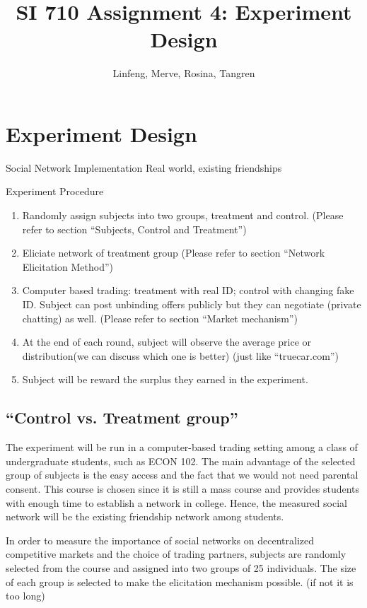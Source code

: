 \documentclass{article}
\title{SI 710 Assignment 4: Experiment Design}
\author{Linfeng, Merve, Rosina, Tangren}
\date{}
\begin{document}
\maketitle
%

\section{Experiment Design}
Social Network Implementation
Real world, existing friendships

Experiment Procedure
\begin{enumerate}
    \item Randomly assign subjects into two groups, treatment and control.
        (Please refer to section ``Subjects, Control and Treatment'')
    \item Eliciate network of treatment group (Please refer to section ``Network
        Elicitation Method'')
    \item Computer based trading: treatment with real ID; control with changing
        fake ID. Subject can post unbinding offers publicly but they can
        negotiate (private chatting) as well. (Please refer to section ``Market
        mechanism'')
    \item At the end of each round, subject will observe the average price or
        distribution(we can discuss which one is better) (just like
        ``truecar.com'')
    \item Subject will be reward the surplus they earned in the experiment.
\end{enumerate}

\subsection{``Control vs. Treatment group''}
The experiment will be run in a computer-based trading setting among a class of
undergraduate students, such as ECON 102. The main advantage of the selected
group of subjects is the easy access and the fact that we would not need
parental consent. This course is chosen since it is still a mass course and
provides students with enough time to establish a network in college. Hence, the
measured social network will be the existing friendship network among students.

In order to measure the importance of social networks on decentralized
competitive markets and the choice of trading partners, subjects are randomly
selected from the course and assigned into two groups of 25 individuals. The
size of each group is selected to make the elicitation mechanism possible. (if
not it is too long)
\end{document}
